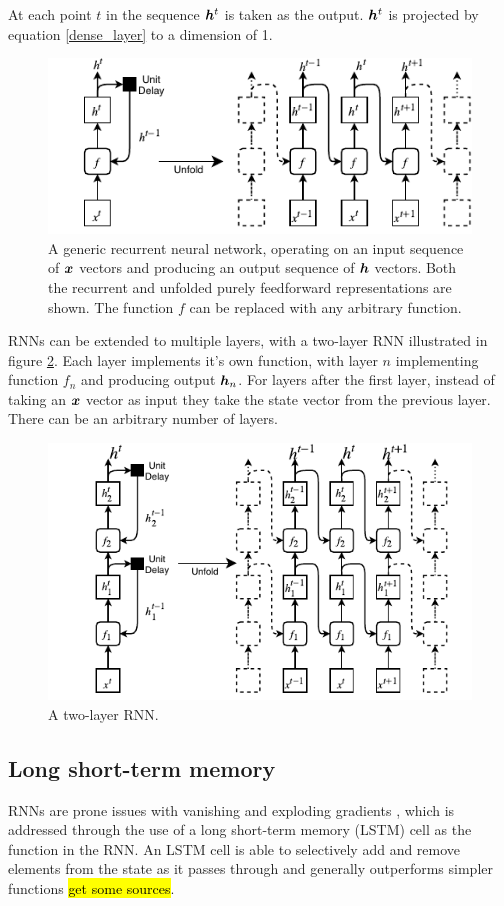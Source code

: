 At each point $t$ in the sequence ${\bm{h}}^t$ is taken as the output.
 ${\bm{h}}^t$ is projected by equation \ref{dense_layer} to a dimension of 1.

\begin{figure}[htbp]
	\centerline{\includegraphics[trim=0 0cm 0 0, width=.5\textwidth]{images/basic_rnn.pdf}}
	\caption{A generic recurrent neural network, operating on an input sequence of ${\bm{x}}$ vectors and producing an output sequence of ${\bm{h}}$ vectors.
		     Both the recurrent and unfolded purely feedforward representations are shown.
		     The function $f$ can be replaced with any arbitrary function.}
	\label{fig:basic_rnn}
\end{figure}

RNNs can be extended to multiple layers, with a two-layer RNN illustrated in figure \ref{fig:multilayer_rnn}.
Each layer implements it's own function, with layer $n$ implementing function $f_n$ and producing output ${\bm{h}}_n$.
For layers after the first layer, instead of taking an ${\bm{x}}$ vector as input they take the state vector from the previous layer.
There can be an arbitrary number of layers.

\begin{figure}[htbp]
	\centerline{\includegraphics[trim=0 0cm 0 0, width=.5\textwidth]{images/multilayer_rnn.pdf}}
	\caption{A two-layer RNN.}
	\label{fig:multilayer_rnn}
\end{figure}

\subsection{Long short-term memory}
RNNs are prone issues with vanishing and exploding gradients \cite{Goodfellow-et-al-2016}, which is addressed through the use of a long short-term memory (LSTM) \cite{hochreiter1997long} cell as the function in the RNN.
An LSTM cell is able to selectively add and remove elements from the state as it passes through and generally outperforms simpler functions \hl{get some sources}.

